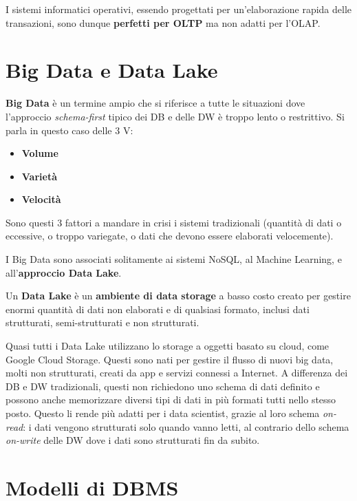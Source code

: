 \documentclass[11pt, a4paper, titlepage, oneside]{scrbook}
\begin{document}
I sistemi informatici operativi, essendo progettati per un'elaborazione rapida delle transazioni, sono dunque \textbf{perfetti per OLTP} ma non adatti per l'OLAP.

\section{Big Data e Data Lake}

\begin{Definizione}
\label{def-big-data}
\textbf{Big Data} è un termine ampio che si riferisce a tutte le situazioni dove l'approccio \textit{schema-first} tipico dei DB e delle DW è troppo lento o restrittivo. Si parla in questo caso delle 3 V:
\begin{itemize}
    \item \textbf{Volume}
    \item \textbf{Varietà}
    \item \textbf{Velocità}
\end{itemize}
Sono questi 3 fattori a mandare in crisi i sistemi tradizionali (quantità di dati o eccessive, o troppo variegate, o dati che devono essere elaborati velocemente).
\end{Definizione}

I Big Data sono associati solitamente ai sistemi NoSQL, al Machine Learning, e all'\textbf{approccio Data Lake}.

\begin{Definizione}
\label{def-data-lake}
Un \textbf{Data Lake} è un \textbf{ambiente di data storage} a basso costo creato per gestire enormi quantità di dati non elaborati e di qualsiasi formato, inclusi dati strutturati, semi-strutturati e non strutturati.
\end{Definizione}

Quasi tutti i Data Lake utilizzano lo storage a oggetti basato su cloud, come Google Cloud Storage. Questi sono nati per gestire il flusso di nuovi big data, molti non strutturati, creati da app e servizi connessi a Internet. A differenza dei DB e DW tradizionali, questi non richiedono uno schema di dati definito e possono anche memorizzare diversi tipi di dati in più formati tutti nello stesso posto. Questo li rende più adatti per i data scientist, grazie al loro schema \textit{on-read}: i dati vengono strutturati solo quando vanno letti, al contrario dello schema \textit{on-write} delle DW dove i dati sono strutturati fin da subito.

\section{Modelli di DBMS}
\end{document}
